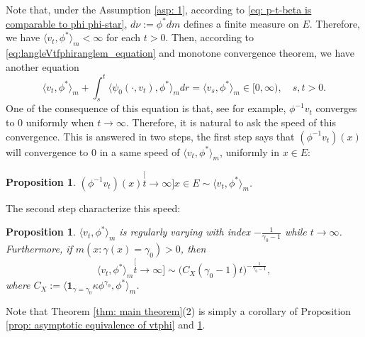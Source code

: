 \documentclass[12pt, a4paper]{amsart}
\newtheorem{prop}[thm]{Proposition}
\theoremstyle{definition}
\numberwithin{equation}{section}
\begin{document}
	Note that, under the Assumption \ref{asp: 1}, according to \eqref{eq: p-t-beta is comparable to phi phi-star}, $d\nu:= \phi^* dm$ defines a finite measure on $E$.
	Therefore, we have $\langle v_t, \phi^*\rangle_m < \infty$ for each $t>0$.
	Then, according to \eqref{eq:langleVtfphiranglem_equation}
and monotone convergence theorem,
	we have another equation
\[ \label{eq: equation of <vt,phi>}
	 \langle v_t,\phi^*\rangle_m + \int_s^t \langle \psi_0(\cdot ,v_t) , \phi^*\rangle_m dr
	= \langle v_s,\phi^*\rangle_m
	\in [0,\infty),
	\quad s, t > 0.
\]
	One of the consequence of this equation is that, see \cite[Lemma 5.1]{RenSongSun2017Spine} for example, $\phi^{-1}v_t$ converges to $0$ uniformly when $t\to\infty$.
	Therefore, it is natural to ask the speed of this convergence.
	This is answered in two steps, the first step says that $(\phi^{-1}v_t)(x)$ will convergence to $0$ in a same speed of $\langle v_t,\phi^*\rangle_m $, uniformly in $x\in E$:

\begin{prop}
\label{prop: convergence in a same speed}
	$(\phi^{-1}v_t)(x) \stackrel[t\to\infty]{x\in E}{\sim} \langle v_t,\phi^*\rangle_m$.
\end{prop}
\label{prop: asymptotic equivalence of vtphi}
	The second step characterize this speed:
\begin{prop}
\label{prop: regularly varying of vt-phi-star}
	$\langle v_t,\phi^*\rangle_m $ is regularly varying with index $-\frac{1}{\gamma_0-1}$ while $t\to \infty$.
	Furthermore, if $m(x: \gamma (x)= \gamma_0)>0$, then
\[
	\langle v_t,\phi^*\rangle_m
	\stackrel[t\to \infty]{}{\sim} \big(C_X(\gamma_0-1) t \big)^{-\frac{1}{\gamma_0 - 1}},
\]
	where $C_X:= \langle \mathbf 1_{\gamma= \gamma_0} \kappa \phi^{\gamma_0}, \phi^* \rangle_m $.
\end{prop}

	Note that Theorem \ref{thm: main theorem}(2) is simply a corollary of Proposition \ref{prop: asymptotic equivalence of vtphi} and \ref{prop: regularly varying of vt-phi-star}.
\end{document}
